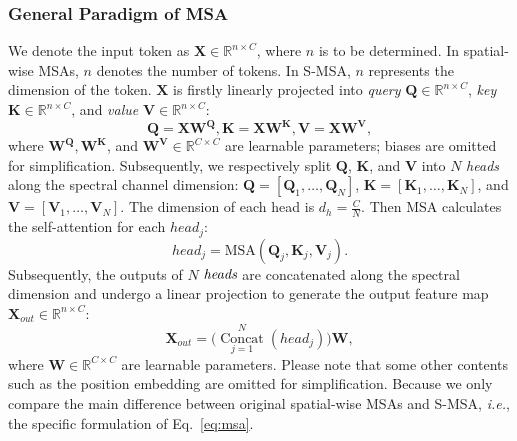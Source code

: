 \documentclass[10pt,twocolumn,letterpaper]{article}
\begin{document}
\subsubsection{General Paradigm of MSA}
We denote the input token as $\mathbf{X} \in \mathbb{R}^{n\times C}$, where $n$ is to be determined. In spatial-wise MSAs, $n$ denotes the number of tokens. In S-MSA, $n$ represents the dimension of the token. $\mathbf{X}$ is firstly linearly projected into \emph{query} $\mathbf{Q} \in \mathbb{R}^{n\times C}$, \emph{key} $\mathbf{K} \in \mathbb{R}^{n\times C}$, and \emph{value} $\mathbf{V} \in \mathbb{R}^{n\times C}$:
\begin{equation}
\mathbf{Q} = \mathbf{X} \mathbf{W^Q}, \mathbf{K} = \mathbf{X} \mathbf{W^K}, \mathbf{V} = \mathbf{X} \mathbf{W^V},
\label{eq:linear_proj}
\end{equation}
where $\mathbf{W^Q},\mathbf{W^K}$, and $\mathbf{W^V} \in \mathbb{R}^{C\times C}$ are learnable parameters; biases are omitted for simplification. Subsequently, we respectively split $\mathbf{Q}$, $\mathbf{K}$, and $\mathbf{V}$ into $N$ \emph{heads} along the spectral channel dimension: $\mathbf{Q} = [\mathbf{Q}_1,\ldots,\mathbf{Q}_N]$, $\mathbf{K}=[\mathbf{K}_1,\ldots,\mathbf{K}_N]$, and $\mathbf{V}=[\mathbf{V}_1,\ldots,\mathbf{V}_N]$. The dimension of each head is $d_h=\frac{C}{N}$. Then MSA calculates the self-attention for each $head_j$:
\begin{equation}
head_j = \text{MSA}(\mathbf{Q}_j,\mathbf{K}_j,\mathbf{V}_j).
\label{eq:msa}
\end{equation}
Subsequently, the outputs of $N$ $\emph{heads}$ are concatenated along the spectral dimension and undergo a linear projection to generate the output feature map $\textbf{X}_{out} \in \mathbb{R}^{n\times C}$: 
\begin{equation}
\textbf{X}_{out} = \big(\mathop{\text{Concat}}\limits_{j=1}^{N}(head_{j})\big)\mathbf{W},
\label{eq:msa_out}
\end{equation}
where $\mathbf{W} \in \mathbb{R}^{C\times C}$ are learnable parameters. Please note that some other contents such as the position embedding are omitted for simplification. Because we only compare the main difference between original spatial-wise MSAs and S-MSA, \emph{i.e.}, the specific formulation of Eq.~\eqref{eq:msa}. 
\end{document}
